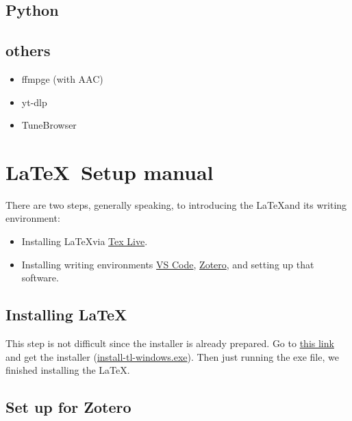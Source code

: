 \documentclass[a4paper,pdftex]{article}
\begin{document}
\subsection{Python}




\subsection{others}

\begin{itemize}
  \item 
  ffmpge (with AAC)

  \item 
  yt-dlp

  \item 
  TuneBrowser
  
\end{itemize}







\section{\LaTeX\ Setup manual}

There are two steps, generally speaking, to introducing the \LaTeX and its writing environment:

\begin{itemize}
  \item 
  Installing \LaTeX via \uline{Tex Live}.

  \item 
  Installing writing environments \uline{VS Code}, \uline{Zotero}, and setting up that software. 

\end{itemize}

\subsection{Installing \LaTeX}

This step is not difficult since the installer is already prepared. Go to \href{https://www.tug.org/texlive/acquire-netinstall.html}{this link} and get the installer (\href{https://mirror.ctan.org/systems/texlive/tlnet/install-tl-windows.exe}{install-tl-windows.exe}). Then just running the exe file, we finished installing the \LaTeX.  

\subsection{Set up for Zotero}
\end{document}
